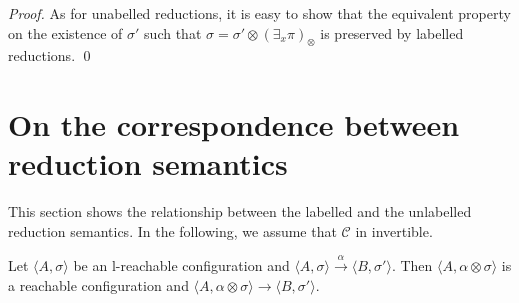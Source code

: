 \documentclass{llncs}
\def\C{{\mathcal C}}
\def\C{{\mathcal C}}
\begin{document}
\begin{proof}
As for unabelled reductions, it is easy to show that the equivalent property
on the existence of $\sigma'$ such that 
$\sigma = \sigma' \otimes (\exists_x \pi)_\otimes$ is preserved by 
labelled reductions. 
\qed
\end{proof}


\section{On the correspondence between reduction semantics}
\label{corres}
This section shows the relationship between the labelled and the unlabelled reduction semantics.
%
In the following, we assume that $\C$ in invertible.

\begin{theorem}[Soundness]
\label{sound}
Let $\langle A, \sigma \rangle$ be an l-reachable configuration and
$\langle A, \sigma \rangle \xrightarrow{\alpha} \langle B, \sigma' \rangle$. 
Then $\langle A, \alpha \otimes \sigma \rangle$ is a reachable configuration and
$\langle A, \alpha \otimes \sigma \rangle \to \langle B, \sigma' \rangle$.
\end{theorem}
\end{document}
